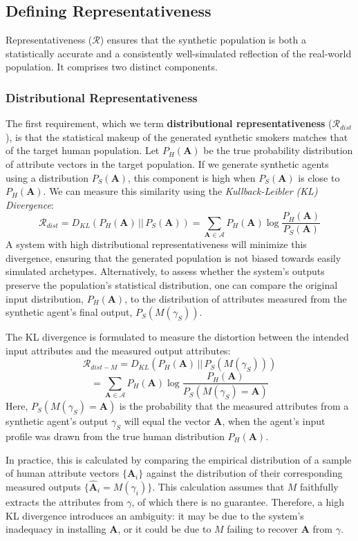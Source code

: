 \subsection{Defining Representativeness}

Representativeness ($\mathcal{R}$) ensures that the synthetic population is both a statistically accurate and a consistently well-simulated reflection of the real-world population. It comprises two distinct components.

\subsubsection{Distributional Representativeness}

The first requirement, which we term \textbf{distributional representativeness} ($\mathcal{R}_{dist}$), is that the statistical makeup of the generated synthetic smokers matches that of the target human population. Let $P_H(\textbf{A})$ be the true probability distribution of attribute vectors in the target population. If we generate synthetic agents using a distribution $P_S(\textbf{A})$, this component is high when $P_S(\textbf{A})$ is close to $P_H(\textbf{A})$. We can measure this similarity using the \emph{Kullback-Leibler (KL) Divergence}:
$$\mathcal{R}_{dist} = D_{KL}(P_H(\textbf{A}) \,||\, P_S(\textbf{A})) = \sum_{\textbf{A} \in \mathcal{A}} P_H(\textbf{A}) \log\frac{P_H(\textbf{A})}{P_S(\textbf{A})}$$
A system with high distributional representativeness will minimize this divergence, ensuring that the generated population is not biased towards easily simulated archetypes. Alternatively, to assess whether the system's outputs preserve the population's statistical distribution, one can compare the original input distribution, $P_H(\textbf{A})$, to the distribution of attributes measured from the synthetic agent's final output, $P_S(M(\gamma_S))$.

The KL divergence is formulated to measure the distortion between the intended input attributes and the measured output attributes:
$$\mathcal{R}_{dist-M} = D_{KL}(P_H(\textbf{A}) \,||\, P_S(M(\gamma_S)))$$
$$= \sum_{\textbf{A} \in \mathcal{A}} P_H(\textbf{A}) \log\frac{P_H(\textbf{A})}{P_S(M(\gamma_S)=\textbf{A})}$$
Here, $P_S(M(\gamma_S)=\textbf{A})$ is the probability that the measured attributes from a synthetic agent's output $\gamma_S$ will equal the vector $\textbf{A}$, when the agent's input profile was drawn from the true human distribution $P_H(\textbf{A})$.

In practice, this is calculated by comparing the empirical distribution of a sample of human attribute vectors $\{\textbf{A}_i\}$ against the distribution of their corresponding measured outputs $\{\hat{\textbf{A}}_i = M(\gamma_i)\}$. This calculation assumes that $M$ faithfully extracts the attributes from $\gamma$, of which there is no guarantee. Therefore, a high KL divergence introduces an ambiguity: it may be due to the system's inadequacy in installing $\textbf{A}$, or it could be due to $M$ failing to recover $\textbf{A}$ from $\gamma$.


